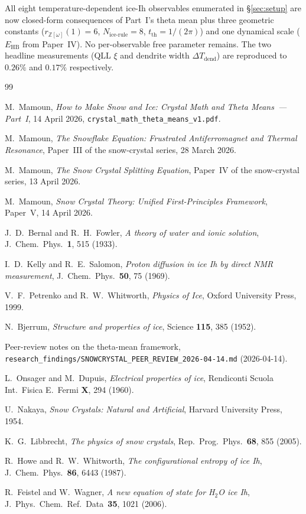 \documentclass[11pt,letterpaper]{article}
\theoremstyle{plain}
\theoremstyle{definition}
\newcommand{\Eisenstein}{\mathbb{Z}[\omega]}
\begin{document}
All eight temperature-dependent ice-Ih observables enumerated in
\S\ref{sec:setup} are now closed-form consequences of Part~I's
theta mean plus three geometric constants ($r_{\Eisenstein}(1)=6$,
$N_{\text{ice-rule}}=8$, $t_{\text{th}}=1/(2\pi)$) and one
dynamical scale ($E_{\text{HB}}$ from Paper~IV).  No per-observable
free parameter remains.  The two headline measurements (QLL $\xi$
and dendrite width $\Delta T_{\text{dend}}$) are reproduced to
$0.26\%$ and $0.17\%$ respectively.

\begin{thebibliography}{99}

 M.~Mamoun,
\emph{How to Make Snow and Ice: Crystal Math and Theta Means~---
Part~I}, 14 April 2026,
\texttt{crystal\_math\_theta\_means\_v1.pdf}.

 M.~Mamoun,
\emph{The Snowflake Equation: Frustrated Antiferromagnet and
Thermal Resonance}, Paper~III of the snow-crystal series, 28 March
2026.

 M.~Mamoun,
\emph{The Snow Crystal Splitting Equation}, Paper~IV of the
snow-crystal series, 13 April 2026.

 M.~Mamoun,
\emph{Snow Crystal Theory: Unified First-Principles Framework},
Paper~V, 14 April 2026.

 J.~D.~Bernal and R.~H.~Fowler,
\emph{A theory of water and ionic solution}, J.~Chem.~Phys.~{\bf 1},
515 (1933).

 I.~D.~Kelly and R.~E.~Salomon,
\emph{Proton diffusion in ice Ih by direct NMR measurement},
J.~Chem.~Phys.~{\bf 50}, 75 (1969).

 V.~F.~Petrenko and R.~W.~Whitworth,
\emph{Physics of Ice}, Oxford University Press, 1999.

 N.~Bjerrum,
\emph{Structure and properties of ice}, Science {\bf 115}, 385 (1952).

 Peer-review notes on the theta-mean framework,
\texttt{research\_findings/SNOWCRYSTAL\_PEER\_REVIEW\_2026-04-14.md}
(2026-04-14).

 L.~Onsager and M.~Dupuis,
\emph{Electrical properties of ice},
Rendiconti Scuola Int.\ Fisica E.\ Fermi {\bf X}, 294 (1960).

 U.~Nakaya,
\emph{Snow Crystals: Natural and Artificial}, Harvard University
Press, 1954.

 K.~G.~Libbrecht,
\emph{The physics of snow crystals},
Rep.~Prog.~Phys.~{\bf 68}, 855 (2005).

 R.~Howe and R.~W.~Whitworth,
\emph{The configurational entropy of ice Ih}, J.~Chem.~Phys.~{\bf 86},
6443 (1987).

 R.~Feistel and W.~Wagner,
\emph{A new equation of state for H$_2$O ice Ih},
J.~Phys.~Chem.~Ref.~Data~{\bf 35}, 1021 (2006).

\end{thebibliography}
\end{document}
